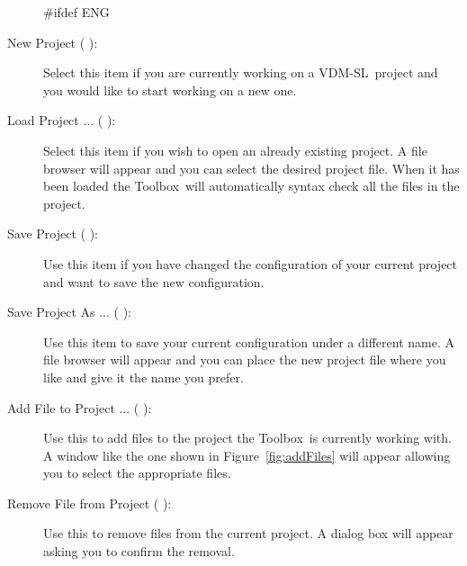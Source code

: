 \documentclass[\pformat,12pt]{article}
\newcommand{\vdmslpp}{VDM-SL}
\newcommand{\Toolbox}{Toolbox}
\newcommand{\vdmslpp}{VDM++}
\newcommand{\Toolbox}{Toolbox}
\newcommand{\guicmd}[1]{{\sf #1}}
\newcommand{\guicmd}[1]{{\gt #1}}
\begin{document}
\begin{description}

#ifdef ENG
\item[\guicmd{New Project} (\hspace{-1.8mm}
\raisebox{-0.8mm}{\texttt{[image: projectnew.png]}}):]
Select this item if you are currently working on 
  a \vdmslpp\ project and you would like to start working on a new
  one.

\item[\guicmd{Load Project ...} (\hspace{-1.2mm}
\raisebox{-0.8mm}{\texttt{[image: load.png]}}\hspace{.6mm}):]
Select this item if you wish to open an already 
  existing project. A file browser will appear and you can select the
  desired project file. When it has been loaded the \Toolbox\ will
  automatically syntax check all the files in the project.

\item[\guicmd{Save Project} (\hspace{-1.8mm}
\raisebox{-0.8mm}{\texttt{[image: projectsave.png]}}):]
  Use this item if you have changed the 
  configuration of your current project and want to save the new
  configuration.

\item[\guicmd{Save Project As ...} (\hspace{-1.5mm}
\raisebox{-0.8mm}{\texttt{[image: projectsaveas.png]}}):]
  Use this item to save your current 
  configuration under a different name. A file browser will appear and
  you can place the new project file where you like and give it the
  name you prefer.

\item[\guicmd{Add File to Project ...} (\hspace{-1.5mm}
\raisebox{-0.8mm}{\texttt{[image: plus.png]}}):] 
  Use this to add files to the
  project  the \Toolbox\ is currently working with. A window like the
  one shown in Figure~\ref{fig:addFiles} will appear allowing you to
  select the appropriate files. 

\item[\guicmd{Remove File from Project} (\hspace{-1.5mm}
 \raisebox{-0.8mm}{\texttt{[image: minus.png]}}):]
 Use this to remove files from
 the current project. A dialog box will appear asking you to confirm
 the removal. 


\end{description}
\end{document}
